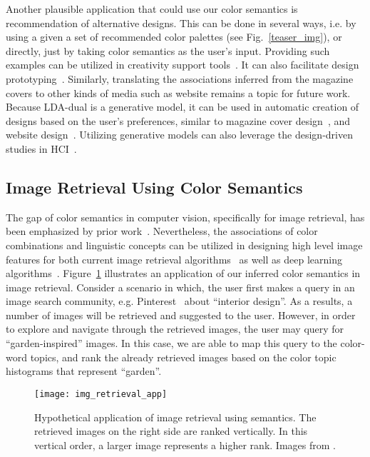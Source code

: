 \documentclass[prodmode,acmtochi]{acmsmall}
\begin{document}
Another plausible application that could use our color semantics is
recommendation of alternative designs. This can be done in several ways, i.e. by using a given a set of recommended color palettes (see Fig.~\ref{teaser_img}), or directly, just by taking color semantics as the user's input. Providing such examples can be utilized in creativity
support tools~\cite{shneiderman2009creativity}.  It can also facilitate
design prototyping~\cite{dow2010parallel}.  Similarly, translating the
associations inferred from the magazine covers to other kinds of media
such as website remains a topic for future work.  Because LDA-dual is a generative
model, it can be used in automatic creation of designs based on the
user's preferences, similar to magazine cover design~\cite{jahanian2013recommendation},
and website design~\cite{kumar2011bricolage}.  Utilizing generative
models can also leverage the design-driven studies in
HCI~\cite{talton2012learning}.

\subsection{Image Retrieval Using Color Semantics}

The gap of color semantics in computer vision,
specifically for image retrieval, has been emphasized by prior work~\cite{smeulders2000content,sethi2001mining,mojsilovic2001capturing,liu2007survey}.
Nevertheless, the associations of color combinations and linguistic
concepts can be utilized in designing high level image features for both
current image retrieval algorithms~\cite{solli2010color} as well as deep learning algorithms~\cite{couprie2013indoor,socher2013grounded}.
Figure~\ref{img_retrieval_app} illustrates an application of our inferred color semantics in image retrieval. Consider a scenario in which, the user first makes a query in an image search community, e.g. Pinterest~\cite{pinterest} about ``interior design''. As a results, a number of images will be retrieved and suggested to the user. However, in order to explore and navigate through the retrieved images, the user may query for ``garden-inspired'' images. In this case, we are able to map this query to the color-word topics, and rank the already retrieved images based on the color topic histograms that represent ``garden''.

\begin{figure}[h!tb]
  \centering
  \texttt{[image: img\_retrieval\_app]}
  \caption{Hypothetical application of image retrieval using semantics. The retrieved images on the right side are ranked vertically. In this vertical order, a larger image represents a higher rank. Images from \protect\cite{pinterest}.} \label{img_retrieval_app}
\end{figure}
\end{document}
